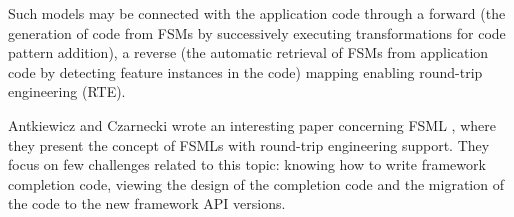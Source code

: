 Such models may be connected with the application code through a forward (the generation of code from FSMs by successively executing transformations for code pattern addition), a reverse (the automatic retrieval of FSMs from application code by detecting feature instances in the code) mapping enabling round-trip engineering (RTE).

Antkiewicz and Czarnecki wrote an interesting paper concerning FSML \cite{FSML}, where they present the concept of FSMLs with round-trip engineering support. They focus on few challenges related to this topic: knowing how to write framework completion code, viewing the design of the completion code and the migration of the code to the new framework API versions.